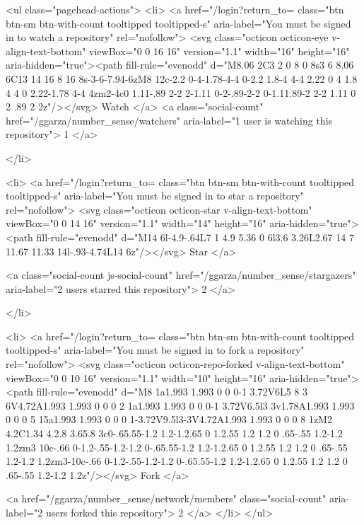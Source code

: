       <ul class="pagehead-actions">
  <li>
      <a href="/login?return_to=%
    class="btn btn-sm btn-with-count tooltipped tooltipped-s"
    aria-label="You must be signed in to watch a repository" rel="nofollow">
    <svg class="octicon octicon-eye v-align-text-bottom" viewBox="0 0 16 16" version="1.1" width="16" height="16" aria-hidden="true"><path fill-rule="evenodd" d="M8.06 2C3 2 0 8 0 8s3 6 8.06 6C13 14 16 8 16 8s-3-6-7.94-6zM8 12c-2.2 0-4-1.78-4-4 0-2.2 1.8-4 4-4 2.22 0 4 1.8 4 4 0 2.22-1.78 4-4 4zm2-4c0 1.11-.89 2-2 2-1.11 0-2-.89-2-2 0-1.11.89-2 2-2 1.11 0 2 .89 2 2z"/></svg>
    Watch
  </a>
  <a class="social-count" href="/ggarza/number_sense/watchers"
     aria-label="1 user is watching this repository">
    1
  </a>

  </li>

  <li>
      <a href="/login?return_to=%
    class="btn btn-sm btn-with-count tooltipped tooltipped-s"
    aria-label="You must be signed in to star a repository" rel="nofollow">
    <svg class="octicon octicon-star v-align-text-bottom" viewBox="0 0 14 16" version="1.1" width="14" height="16" aria-hidden="true"><path fill-rule="evenodd" d="M14 6l-4.9-.64L7 1 4.9 5.36 0 6l3.6 3.26L2.67 14 7 11.67 11.33 14l-.93-4.74L14 6z"/></svg>
    Star
  </a>

    <a class="social-count js-social-count" href="/ggarza/number_sense/stargazers"
      aria-label="2 users starred this repository">
      2
    </a>

  </li>

  <li>
      <a href="/login?return_to=%
        class="btn btn-sm btn-with-count tooltipped tooltipped-s"
        aria-label="You must be signed in to fork a repository" rel="nofollow">
        <svg class="octicon octicon-repo-forked v-align-text-bottom" viewBox="0 0 10 16" version="1.1" width="10" height="16" aria-hidden="true"><path fill-rule="evenodd" d="M8 1a1.993 1.993 0 0 0-1 3.72V6L5 8 3 6V4.72A1.993 1.993 0 0 0 2 1a1.993 1.993 0 0 0-1 3.72V6.5l3 3v1.78A1.993 1.993 0 0 0 5 15a1.993 1.993 0 0 0 1-3.72V9.5l3-3V4.72A1.993 1.993 0 0 0 8 1zM2 4.2C1.34 4.2.8 3.65.8 3c0-.65.55-1.2 1.2-1.2.65 0 1.2.55 1.2 1.2 0 .65-.55 1.2-1.2 1.2zm3 10c-.66 0-1.2-.55-1.2-1.2 0-.65.55-1.2 1.2-1.2.65 0 1.2.55 1.2 1.2 0 .65-.55 1.2-1.2 1.2zm3-10c-.66 0-1.2-.55-1.2-1.2 0-.65.55-1.2 1.2-1.2.65 0 1.2.55 1.2 1.2 0 .65-.55 1.2-1.2 1.2z"/></svg>
        Fork
      </a>

    <a href="/ggarza/number_sense/network/members" class="social-count"
       aria-label="2 users forked this repository">
      2
    </a>
  </li>
</ul>

